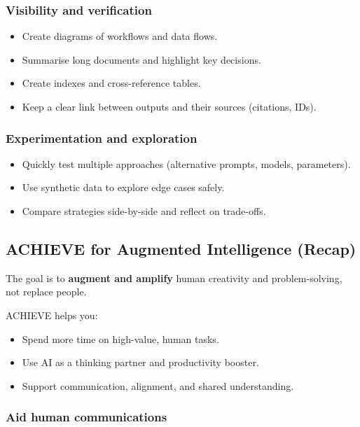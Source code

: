 \documentclass[
  letterpaper,
  DIV=11,
  numbers=noendperiod]{scrreprt}
\providecommand{\tightlist}{%
  \setlength{\itemsep}{0pt}\setlength{\parskip}{0pt}}
\begin{document}
\subsubsection{Visibility and
verification}\label{visibility-and-verification}

\begin{itemize}
\tightlist
\item
  Create diagrams of workflows and data flows.
\item
  Summarise long documents and highlight key decisions.
\item
  Create indexes and cross-reference tables.
\item
  Keep a clear link between outputs and their sources (citations, IDs).
\end{itemize}

\subsubsection{Experimentation and
exploration}\label{experimentation-and-exploration}

\begin{itemize}
\tightlist
\item
  Quickly test multiple approaches (alternative prompts, models,
  parameters).
\item
  Use synthetic data to explore edge cases safely.
\item
  Compare strategies side-by-side and reflect on trade-offs.
\end{itemize}

\subsection{ACHIEVE for Augmented Intelligence
(Recap)}\label{achieve-for-augmented-intelligence-recap}

The goal is to \textbf{augment and amplify} human creativity and
problem-solving, not replace people.

ACHIEVE helps you:

\begin{itemize}
\tightlist
\item
  Spend more time on high-value, human tasks.
\item
  Use AI as a thinking partner and productivity booster.
\item
  Support communication, alignment, and shared understanding.
\end{itemize}

\subsubsection{Aid human communications}\label{aid-human-communications}
\end{document}
